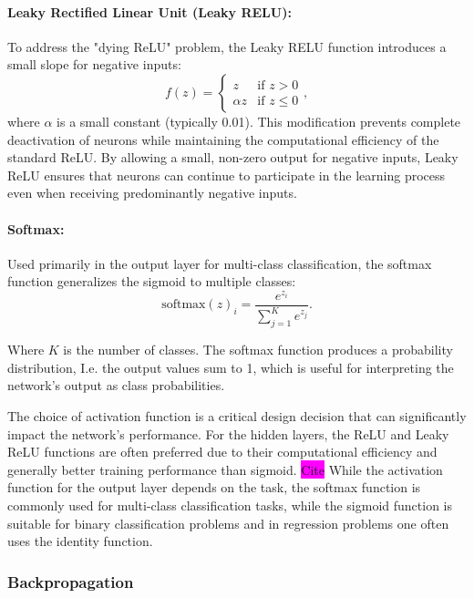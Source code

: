 \paragraph*{Leaky Rectified Linear Unit (Leaky RELU):}
To address the "dying ReLU" problem, the Leaky RELU function introduces a small slope for negative inputs:
\begin{equation}
    f(z) =
    \begin{cases} z & \text{if } z > 0 \\
        \alpha z & \text{if } z \leq 0
    \end{cases},
\end{equation}
where \( \alpha \) is a small constant (typically 0.01). This modification prevents complete deactivation of neurons while maintaining the computational efficiency of the standard ReLU. By allowing a small, non-zero output for negative inputs, Leaky ReLU ensures that neurons can continue to participate in the learning process even when receiving predominantly negative inputs.

\paragraph*{Softmax:}
Used primarily in the output layer for multi-class classification, the softmax function generalizes the sigmoid to multiple classes:
\begin{equation}
    \text{softmax}(z)_i = \frac{e^{z_i}}{\sum_{j=1}^{K} e^{z_j}}.
\end{equation}

Where \( K \) is the number of classes. The softmax function produces a probability distribution, I.e. the output values sum to 1, which is useful for interpreting the network's output as class probabilities.

The choice of activation function is a critical design decision that can significantly impact the network's performance. For the hidden layers, the ReLU and Leaky ReLU functions are often preferred due to their computational efficiency and generally better training performance than sigmoid. \colorbox{magenta}{Cite} While the activation function for the output layer depends on the task, the softmax function is commonly used for multi-class classification tasks, while the sigmoid function is suitable for binary classification problems and in regression problems one often uses the identity function.

\subsubsection{Backpropagation}

